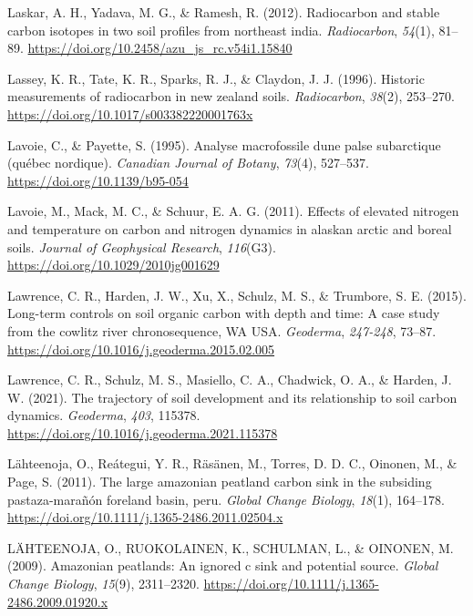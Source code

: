 \documentclass[]{article}
\begin{document}
\leavevmode\hypertarget{ref-Laskar_2012}{}%
Laskar, A. H., Yadava, M. G., \& Ramesh, R. (2012). Radiocarbon and
stable carbon isotopes in two soil profiles from northeast india.
\emph{Radiocarbon}, \emph{54}(1), 81--89.
\url{https://doi.org/10.2458/azu_js_rc.v54i1.15840}

\leavevmode\hypertarget{ref-Lassey_1996}{}%
Lassey, K. R., Tate, K. R., Sparks, R. J., \& Claydon, J. J. (1996).
Historic measurements of radiocarbon in new zealand soils.
\emph{Radiocarbon}, \emph{38}(2), 253--270.
\url{https://doi.org/10.1017/s003382220001763x}

\leavevmode\hypertarget{ref-Lavoie_1995}{}%
Lavoie, C., \& Payette, S. (1995). Analyse macrofossile dune palse
subarctique (québec nordique). \emph{Canadian Journal of Botany},
\emph{73}(4), 527--537. \url{https://doi.org/10.1139/b95-054}

\leavevmode\hypertarget{ref-Lavoie_2011}{}%
Lavoie, M., Mack, M. C., \& Schuur, E. A. G. (2011). Effects of elevated
nitrogen and temperature on carbon and nitrogen dynamics in alaskan
arctic and boreal soils. \emph{Journal of Geophysical Research},
\emph{116}(G3). \url{https://doi.org/10.1029/2010jg001629}

\leavevmode\hypertarget{ref-Lawrence_2015}{}%
Lawrence, C. R., Harden, J. W., Xu, X., Schulz, M. S., \& Trumbore, S.
E. (2015). Long-term controls on soil organic carbon with depth and
time: A case study from the cowlitz river chronosequence, WA USA.
\emph{Geoderma}, \emph{247-248}, 73--87.
\url{https://doi.org/10.1016/j.geoderma.2015.02.005}

\leavevmode\hypertarget{ref-Lawrence_2021}{}%
Lawrence, C. R., Schulz, M. S., Masiello, C. A., Chadwick, O. A., \&
Harden, J. W. (2021). The trajectory of soil development and its
relationship to soil carbon dynamics. \emph{Geoderma}, \emph{403},
115378. \url{https://doi.org/10.1016/j.geoderma.2021.115378}

\leavevmode\hypertarget{ref-L_hteenoja_2011}{}%
Lähteenoja, O., Reátegui, Y. R., Räsänen, M., Torres, D. D. C., Oinonen,
M., \& Page, S. (2011). The large amazonian peatland carbon sink in the
subsiding pastaza-marañón foreland basin, peru. \emph{Global Change
Biology}, \emph{18}(1), 164--178.
\url{https://doi.org/10.1111/j.1365-2486.2011.02504.x}

\leavevmode\hypertarget{ref-L_HTEENOJA_2009}{}%
LÄHTEENOJA, O., RUOKOLAINEN, K., SCHULMAN, L., \& OINONEN, M. (2009).
Amazonian peatlands: An ignored c sink and potential source.
\emph{Global Change Biology}, \emph{15}(9), 2311--2320.
\url{https://doi.org/10.1111/j.1365-2486.2009.01920.x}
\end{document}
